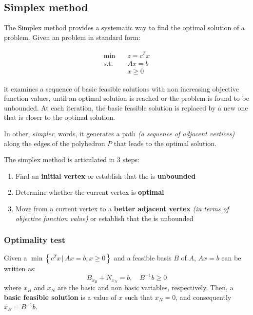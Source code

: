 \documentclass[english]{article}
\begin{document}
\subsection{Simplex method}

The Simplex method provides a systematic way to find the optimal solution of a \LP problem.
Given an \LP problem in standard form:

\begin{gather*}
  \begin{aligned}
    \min \quad        & z = c^T x \\
    \text{s.t.} \quad & Ax = b    \\
                      & x \geq 0
  \end{aligned}
\end{gather*}

it examines a sequence of basic feasible solutions with non increasing objective function values, until an optimal solution is reached or the problem is found to be unbounded.
At each iteration, the basic feasible solution is replaced by a new one that is closer to the optimal solution.

In other, \textit{simpler}, words, it generates a path \textit{(a sequence of adjacent vertices)} along the edges of the polyhedron \(P\) that leads to the optimal solution.

The simplex method is articulated in \(3\) steps:

\begin{enumerate}
  \item Find an \textbf{initial vertex} or establish that the \LP is \textbf{unbounded}
  \item Determine whether the current vertex is \textbf{optimal}
  \item Move from a current vertex to a \textbf{better adjacent vertex} \textit{(in terms of objective function value)} or establish that the \LP is unbounded
\end{enumerate}

\subsubsection{Optimality test}

Given a \LP \(\min\left\{ c^T x \, | \, Ax = b, x \geq 0 \right\}\) and a feasible basis \(B\) of \(A\), \(Ax = b\) can be written as:
\[ B_{x_B} + N_{x_N} = b, \quad B^{-1}b \geq 0\]
where \(x_B\) and \(x_N\) are the basic and non basic variables, respectively.
Then, a \textbf{basic feasible solution} is a value of \(x\) such that \(x_N = 0\), and consequently \(x_B = B^{-1}b\).
\end{document}
